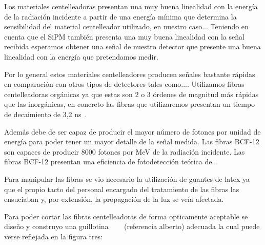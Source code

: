 Los materiales centelleadoras presentan una muy buena linealidad con la energía de la radiación incidente a partir de una energía mínima que determina la sensibilidad del material centelleador utilizado, en nuestro caso... Teniendo en cuenta que el SiPM también presenta una muy buena linealidad con la señal recibida esperamos obtener una señal de nuestro detector que presente una buena linealidad con la energía que pretendamos medir.

Por lo general estos materiales centelleadores producen señales bastante rápidas en comparación con otros tipos de detectores tales como.... Utilizamos fibras centelleadoras orgánicas ya que estas son 2 o 3 órdenes de magnitud más rápidas que las inorgánicas,  en concreto las fibras que utilizaremos presentan un tiempo de decaimiento de 3,2 ns~\cite{datasheet}. 

Además debe de ser capaz de producir el mayor número de fotones por unidad de energía para poder tener un mayor detalle de la señal medida. Las fibras BCF-12 son capaces de producir 8000 fotones por MeV de la radiación incidente. Las fibras BCF-12 presentan una eficiencia de fotodetección teórica de...~\cite{datasheet}

Para manipular las fibras se vio necesario la utilización de guantes de latex ya que el propio tacto  del personal encargado del tratamiento de las fibras las ensuciaban y, por extensión, la propagación de la luz se veía afectada.

Para poder cortar las fibras centelleadoras de forma opticamente aceptable se diseño y construyo una guillotina~\cite{anguloytiempo}~\cite{dependencias} ~\cite{tesisfibras} (referencia alberto) adecuada la cual puede verse reflejada en la figura tres:

